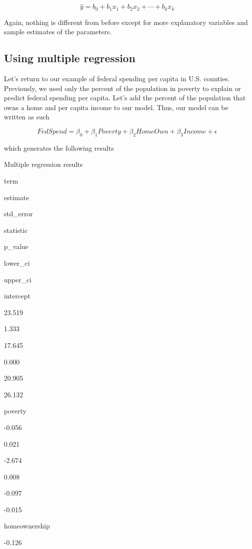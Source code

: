 \documentclass[
]{book}
\begin{document}
\begin{equation}
\hat{y}=b_0+b_1x_1+b_2x_2+\cdots +b_kx_k
\label{eq:multregsample}
\end{equation}

Again, nothing is different from before except for more explanatory variables and sample estimates of the parameters.

\hypertarget{using-multiple-regression}{%
\subsection{Using multiple regression}\label{using-multiple-regression}}

Let's return to our example of federal spending per capita in U.S. counties. Previously, we used only the percent of the population in poverty to explain or predict federal spending per capita. Let's add the percent of the population that owns a home and per capita income to our model. Thus, our model can be written as such

\begin{equation}
FedSpend = \beta_0 + \beta_1Poverty + \beta_2HomeOwn + \beta_3Income + \epsilon
\label{eq:multregex}
\end{equation}

which generates the following results

\label{tab:multregextab}Multiple regression results

term

estimate

std\_error

statistic

p\_value

lower\_ci

upper\_ci

intercept

23.519

1.333

17.645

0.000

20.905

26.132

poverty

-0.056

0.021

-2.674

0.008

-0.097

-0.015

homeownership

-0.126
\end{document}
